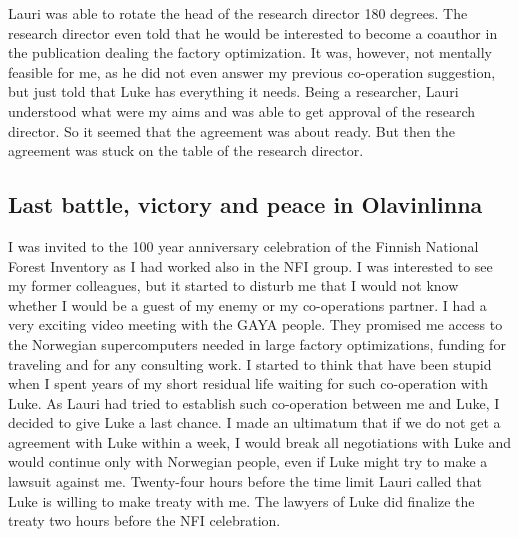 Lauri was able to rotate the head of the research director 180 degrees. The research director even told
that he would be interested to become a coauthor in the publication dealing the factory
optimization. It was, however, not mentally feasible for me, as
he did not even
answer my previous co-operation suggestion, but just told that Luke has everything
it needs. Being a researcher, Lauri understood what
were my aims and was able to get approval of the research director.
So it seemed that
the agreement was about ready. But then the agreement was
stuck on the table of the research director.
\subsection{Last battle, victory and peace in Olavinlinna}
\label{preface7}
I was invited to the 100 year anniversary celebration of the Finnish National Forest Inventory
as I had worked also in the NFI group. I was interested to see my former colleagues,
but it started to disturb me
that I would not know whether I would be a guest of my enemy
or my co-operations partner.
I had a very exciting video meeting with the GAYA people. They promised me access
to the Norwegian supercomputers needed in large factory optimizations, funding for traveling
and for any consulting work. I started to think that have been stupid
when I spent years of my short residual life waiting for such co-operation
with Luke. As Lauri had tried
to establish such co-operation between me and Luke,
I decided to give Luke a last chance.
I made an ultimatum that if we do not get a agreement with Luke within a week,
I would break all negotiations with Luke and would continue only with Norwegian people,
even if Luke might try to make a lawsuit against me.
Twenty-four hours before the time
limit Lauri called that Luke is willing to make treaty with me.
The lawyers of Luke did finalize the treaty
two hours before the NFI celebration.

